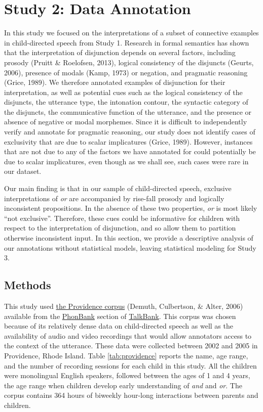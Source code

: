 \documentclass[
  ,man,floatsintext]{apa6}
\begin{document}
\hypertarget{study-2-data-annotation}{%
\section{Study 2: Data Annotation}\label{study-2-data-annotation}}

In this study we focused on the interpretations of a subset of connective examples in child-directed speech from Study 1. Research in formal semantics has shown that the interpretation of disjunction depends on several factors, including prosody (Pruitt \& Roelofsen, 2013), logical consistency of the disjuncts (Geurts, 2006), presence of modals (Kamp, 1973) or negation, and pragmatic reasoning (Grice, 1989). We therefore annotated examples of disjunction for their interpretation, as well as potential cues such as the logical consistency of the disjuncts, the utterance type, the intonation contour, the syntactic category of the disjuncts, the communicative function of the utterance, and the presence or absence of negative or modal morphemes. Since it is difficult to independently verify and annotate for pragmatic reasoning, our study does not identify cases of exclusivity that are due to scalar implicatures (Grice, 1989). However, instances that are not due to any of the factors we have annotated for could potentially be due to scalar implicatures, even though as we shall see, such cases were rare in our dataset.

Our main finding is that in our sample of child-directed speech, exclusive interpretations of \emph{or} are accompanied by rise-fall prosody and logically inconsistent propositions. In the absence of these two properties, \emph{or} is most likely ``not exclusive''. Therefore, these cues could be informative for children with respect to the interpretation of disjunction, and so allow them to partition otherwise inconsistent input. In this section, we provide a descriptive analysis of our annotations without statistical models, leaving statistical modeling for Study 3.

\hypertarget{methods-1}{%
\subsection{Methods}\label{methods-1}}

This study used \href{https://phonbank.talkbank.org/browser/index.php?url=Eng-NA/Providence/}{the Providence corpus} (Demuth, Culbertson, \& Alter, 2006) available from the \href{https://phonbank.talkbank.org}{PhonBank} section of \href{https://talkbank.org/}{TalkBank}. This corpus was chosen because of its relatively dense data on child-directed speech as well as the availability of audio and video recordings that would allow annotators access to the context of the utterance. These data were collected between 2002 and 2005 in Providence, Rhode Island. Table \ref{tab:providence} reports the name, age range, and the number of recording sessions for each child in this study. All the children were monolingual English speakers, followed between the ages of 1 and 4 years, the age range when children develop early understanding of \emph{and} and \emph{or}. The corpus contains 364 hours of biweekly hour-long interactions between parents and children.
\end{document}
